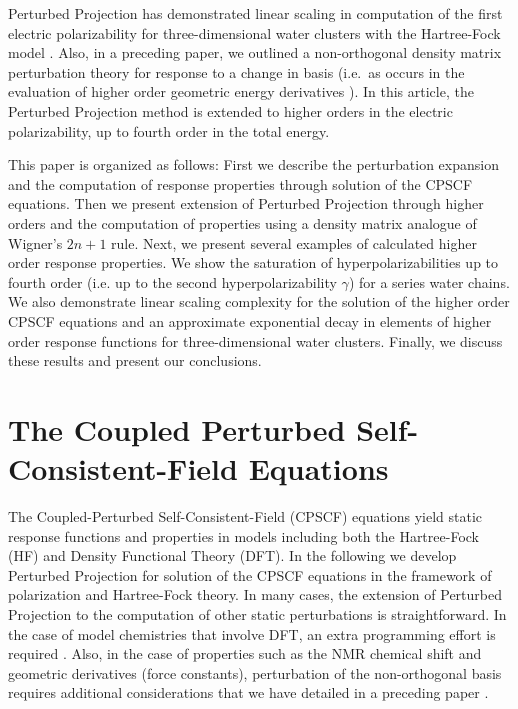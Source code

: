 \documentclass[prl,twocolumn,showpacs,twocolumngrid,superbib]{revtex4}
\begin{document}
Perturbed Projection has demonstrated linear scaling in 
computation of the first electric polarizability for three-dimensional water clusters with the 
Hartree-Fock model \cite{VWeber04}. Also, in a preceding paper, we outlined a non-orthogonal density matrix
perturbation theory \cite{ANiklasson05a} for response to a change in basis (i.e.~as occurs in 
the evaluation of higher order geometric energy derivatives \cite{RAmos89}). 
In this article, the Perturbed Projection method is extended to higher orders
in the electric polarizability, up to fourth order in the total energy.  

This paper is organized as follows: First we describe the perturbation expansion and 
the computation of response properties through solution of the CPSCF equations.
Then we present extension of Perturbed Projection through higher orders and the 
computation of properties using a density matrix analogue of Wigner's $2 n+1$ rule.
Next,  we present several examples of calculated higher order response properties.
We show the saturation of hyperpolarizabilities up to  fourth order (i.e. up to the 
second hyperpolarizability $\gamma$) for a series water chains.
We also  demonstrate linear scaling complexity for the solution of the higher order CPSCF
equations and an approximate exponential decay in elements of higher order response functions
for three-dimensional water clusters.  Finally, we discuss these results and present our conclusions. 

\section{The Coupled Perturbed Self-Consistent-Field Equations}

The Coupled-Perturbed Self-Consistent-Field (CPSCF) equations yield
static response functions and properties in models including both the 
Hartree-Fock (HF) and Density Functional Theory (DFT).  In the following
we develop Perturbed Projection for solution of the CPSCF equations in the framework of polarization and 
Hartree-Fock theory.  In many cases, the extension of Perturbed Projection to
the computation of other static perturbations is straightforward.  In
the case of model chemistries that involve DFT, an extra programming effort is required \cite{ALee94,PSalek02}.
Also, in the case of properties such as the NMR chemical shift and geometric derivatives 
(force constants), perturbation of the non-orthogonal basis requires additional 
considerations that we have detailed in a preceding paper \cite{ANiklasson05a}.
\end{document}
